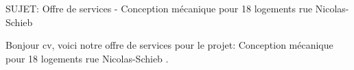 SUJET: Offre de services - Conception mécanique pour 18 logements rue Nicolas-Schieb \par Bonjour cv, voici notre offre de services pour le projet: Conception mécanique pour 18 logements rue Nicolas-Schieb .